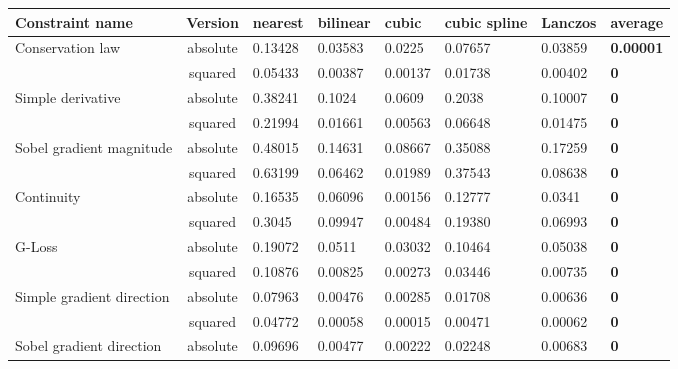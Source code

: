 \begin{landscape}
{
\shorthandoff{-}
\begin{table}[htbp]
    \centering
    \begin{tabular}{|l|c|l|l|l|l|l|l|}
        \hline
        \textbf{Constraint name} & \textbf{Version} & \textbf{nearest} & \textbf{bilinear} & \textbf{cubic} & \textbf{cubic spline} & \textbf{Lanczos} & \textbf{average} \\ 
        \hline
        \hline
        \multirow{2}{*}{Conservation law} & absolute & 0.13428 & 0.03583 & 0.0225 & 0.07657 & 0.03859 & \textbf{0.00001} \\ 
        \cline{2-8}
        & squared & 0.05433 & 0.00387 & 0.00137 & 0.01738 & 0.00402 & \textbf{0} \\
        \hline
        \multirow{2}{*}{Simple derivative} & absolute & 0.38241 & 0.1024 & 0.0609 & 0.2038 & 0.10007 & \textbf{0} \\ 
        \cline{2-8}
        & squared & 0.21994 & 0.01661 & 0.00563 & 0.06648 & 0.01475 & \textbf{0}  \\       
        \hline
        \multirow{2}{*}{Sobel gradient magnitude} & absolute & 0.48015 & 0.14631 & 0.08667 & 0.35088 & 0.17259 & \textbf{0} \\ 
        \cline{2-8}
        & squared & 0.63199 & 0.06462 & 0.01989 & 0.37543 & 0.08638 & \textbf{0}  \\       
        \hline
        \multirow{2}{*}{Continuity} & absolute & 0.16535 & 0.06096 & 0.00156 & 0.12777 & 0.0341 & \textbf{0} \\ 
        \cline{2-8}
        & squared & 0.3045 & 0.09947 & 0.00484 & 0.19380 & 0.06993 & \textbf{0} \\         
        \hline
        \multirow{2}{*}{G-Loss} & absolute & 0.19072 & 0.0511 & 0.03032 & 0.10464 & 0.05038 & \textbf{0} \\ 
        \cline{2-8}
        & squared & 0.10876 & 0.00825 & 0.00273 & 0.03446 & 0.00735 & \textbf{0} \\        
        \hline
        \multirow{2}{*}{Simple gradient direction} & absolute & 0.07963 & 0.00476 & 0.00285 & 0.01708 & 0.00636 & \textbf{0} \\ 
        \cline{2-8}
        & squared & 0.04772 & 0.00058 & 0.00015 & 0.00471 & 0.00062 & \textbf{0} \\        
        \hline
        \multirow{2}{*}{Sobel gradient direction} & absolute & 0.09696 & 0.00477 & 0.00222 & 0.02248 & 0.00683 & \textbf{0} \\ 

\end{tabular}
\end{table}}
\end{landscape}
